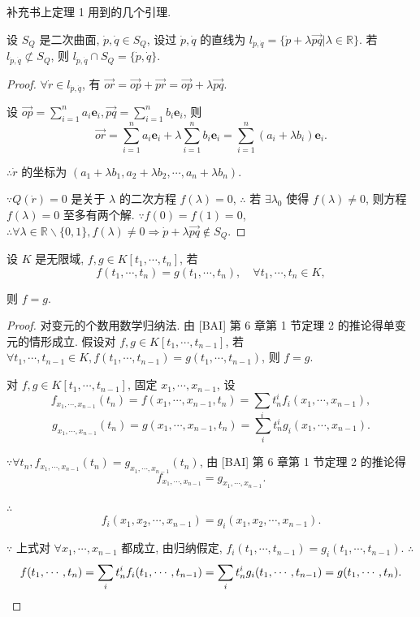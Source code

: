 \documentclass[color=black,device=normal,lang=cn,mode=geye]{elegantnote}
\begin{document}
补充书上定理 1 用到的几个引理.
\begin{lemma}
    设 $S_Q$ 是二次曲面, $\dot{p},\dot{q}\in S_Q$, 设过 $\dot{p},\dot{q}$ 的直线为 $l_{\dot{p},\dot{q}}=\{\dot{p}+\lambda\overrightarrow{pq}|\lambda\in\mathbb{R}\}$. 若 $l_{\dot{p},\dot{q}}\not\subset S_Q$, 则 $l_{\dot{p},\dot{q}}\cap S_Q=\{\dot{p},\dot{q}\}$.
\end{lemma}
\begin{proof}
    $\forall\dot{r}\in l_{\dot{p},\dot{q}}$, 有 $\overrightarrow{or}=\overrightarrow{op}+\overrightarrow{pr}=\overrightarrow{op}+\lambda\overrightarrow{pq}$.

    设 $\overrightarrow{op}=\sum\limits_{i=1}^na_i\boldsymbol{e}_i,\overrightarrow{pq}=\sum\limits_{i=1}^nb_i\boldsymbol{e}_i$, 则
    \[\overrightarrow{or}=\sum\limits_{i=1}^na_i\boldsymbol{e}_i+\lambda\sum\limits_{i=1}^nb_i\boldsymbol{e}_i=\sum\limits_{i=1}^n(a_i+\lambda b_i)\boldsymbol{e}_i.\]

    $\therefore\dot{r}$ 的坐标为 $(a_1+\lambda b_1,a_2+\lambda b_2,\cdots,a_n+\lambda b_n)$.

    $\because Q(\dot{r})=0$ 是关于 $\lambda$ 的二次方程 $f(\lambda)=0$, $\therefore$ 若 $\exists\lambda_0$ 使得 $f(\lambda)\neq0$, 则方程 $f(\lambda)=0$ 至多有两个解. $\because f(0)=f(1)=0$, $\therefore\forall\lambda\in\mathbb{R}\backslash\{0,1\},f(\lambda)\neq0\Rightarrow\dot{p}+\lambda\overrightarrow{pq}\notin S_Q$.
\end{proof}
\begin{lemma}\label{l2.2}
    设 $K$ 是无限域, $f,g\in K[t_1,\cdots,t_n]$, 若
    \[f(t_1,\cdots,t_n)=g(t_1,\cdots,t_n),\quad\forall t_1,\cdots,t_n\in K,\]
    
    则 $f=g$.
\end{lemma}
\begin{proof}
    对变元的个数用数学归纳法. 由 [BAI] 第 6 章第 1 节定理 2 的推论得单变元的情形成立. 假设对 $f,g\in K[t_1,\cdots,t_{n-1}]$, 若 $\forall t_1,\cdots,t_{n-1}\in K,f(t_1,\cdots,t_{n-1})=g(t_1,\cdots,t_{n-1})$, 则 $f=g$.

    对 $f,g\in K[t_1,\cdots,t_{n-1}]$, 固定 $x_1,\cdots,x_{n-1}$, 设
    \[f_{x_1,\cdots,x_{n-1}}(t_n)=f(x_1,\cdots,x_{n-1},t_n)=\sum\limits_it_n^if_i(x_1,\cdots,x_{n-1}),\]
    \[g_{x_1,\cdots,x_{n-1}}(t_n)=g(x_1,\cdots,x_{n-1},t_n)=\sum\limits_it_n^ig_i(x_1,\cdots,x_{n-1}).\]

    $\because\forall t_n,f_{x_1,\cdots,x_{n-1}}(t_n)=g_{x_1,\cdots,x_{n-1}}(t_n)$, 由 [BAI] 第 6 章第 1 节定理 2 的推论得
    \[f_{x_1,\cdots,x_{n-1}}=g_{x_1,\cdots,x_{n-1}}.\]

    $\therefore$
    \[f_i(x_1,x_2,\cdots,x_{n-1})=g_i(x_1,x_2,\cdots,x_{n-1}).\]

    $\because$ 上式对 $\forall x_1,\cdots,x_{n-1}$ 都成立, 由归纳假定, $f_i(t_1,\cdots,t_{n-1})=g_i(t_1,\cdots,t_{n-1})$. $\therefore$
    \[f(t_1,\cdots,t_n)=\sum\limits_it_n^if_i(t_1,\cdots,t_{n-1})=\sum\limits_it_n^ig_i(t_1,\cdots,t_{n-1})=g(t_1,\cdots,t_n).\qedhere\]
\end{proof}
\end{document}
